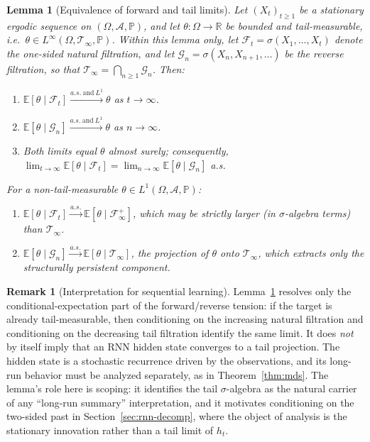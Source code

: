 \documentclass[bj,authoryear]{imsart}
\theoremstyle{plain}
\newtheorem{lemma}[theorem]{Lemma}
\theoremstyle{definition}
\newtheorem{remark}{Remark}[section]
\newcommand{\E}{\mathbb{E}}
\newcommand{\Prob}{\mathbb{P}}
\newcommand{\R}{\mathbb{R}}
\newcommand{\F}{\mathcal{F}}
\newcommand{\G}{\mathcal{G}}
\newcommand{\A}{\mathcal{A}}
\newcommand{\Tsig}{\mathcal{T}_\infty}
\newcommand{\given}{\mid}
\begin{document}
\begin{lemma}[Equivalence of forward and tail limits]
\label{lem:equiv}
  Let $(X_t)_{t\geq 1}$ be a stationary ergodic sequence on $(\Omega,\A,\Prob)$,
  and let $\theta : \Omega \to \R$ be bounded and tail-measurable,
  i.e.\ $\theta \in L^\infty(\Omega, \Tsig, \Prob)$.
  Within this lemma only, let $\F_t = \sigma(X_1,\ldots,X_t)$ denote the
  one-sided natural filtration, and let
  $\G_n = \sigma(X_n,X_{n+1},\ldots)$ be the reverse filtration,
  so that $\Tsig = \bigcap_{n\geq 1}\G_n$.  Then:
  \begin{enumerate}[label=(\alph*), itemsep=3pt]
    \item $\E[\theta\given\F_t] \xrightarrow{a.s.\ \text{and}\ L^1} \theta$
      as $t \to \infty$.
    \item $\E[\theta\given\G_n] \xrightarrow{a.s.\ \text{and}\ L^1} \theta$
      as $n \to \infty$.
    \item Both limits equal $\theta$ almost surely; consequently,
      $\lim_{t\to\infty}\E[\theta\given\F_t] = \lim_{n\to\infty}\E[\theta\given\G_n]$
      a.s.
  \end{enumerate}
  For a non-tail-measurable $\theta \in L^1(\Omega,\A,\Prob)$:
  \begin{enumerate}[label=(\alph*), start=4, itemsep=3pt]
    \item $\E[\theta\given\F_t] \xrightarrow{a.s.} \E[\theta\given\F_\infty^+]$,
      which may be strictly larger (in $\sigma$-algebra terms) than $\Tsig$.
    \item $\E[\theta\given\G_n] \xrightarrow{a.s.} \E[\theta\given\Tsig]$,
      the projection of $\theta$ onto $\Tsig$, which extracts only the
      structurally persistent component.
  \end{enumerate}
\end{lemma}

\begin{remark}[Interpretation for sequential learning]
\label{rem:interp-lemma}
  Lemma~\ref{lem:equiv} resolves only the conditional-expectation part of the
  forward/reverse tension: if the target is already tail-measurable, then
  conditioning on the increasing natural filtration and conditioning on the
  decreasing tail filtration identify the same limit.  It does \emph{not} by
  itself imply that an RNN hidden state converges to a tail projection.  The
  hidden state is a stochastic recurrence driven by the observations, and its
  long-run behavior must be analyzed separately, as in
  Theorem~\ref{thm:mds}.  The lemma's role here is scoping: it identifies
  the tail $\sigma$-algebra as the natural carrier of any ``long-run
  summary'' interpretation, and it motivates conditioning on the two-sided
  past in Section~\ref{sec:rnn-decomp}, where the object of analysis is
  the stationary innovation rather than a tail limit of $h_t$.
\end{remark}
\end{document}
